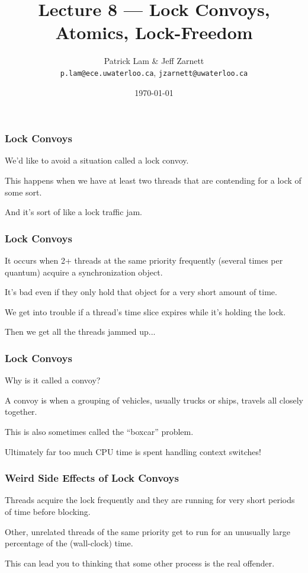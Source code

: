 

\title{Lecture 8 --- Lock Convoys, Atomics, Lock-Freedom}

\author{Patrick Lam \& Jeff Zarnett \\ \small \texttt{p.lam@ece.uwaterloo.ca}, \texttt{jzarnett@uwaterloo.ca}}
\date{\today}




\begin{frame}
  \titlepage

 \end{frame}
 

\begin{frame}
\frametitle{Lock Convoys}
We'd like to avoid a situation called a \alert{lock convoy}. 

This happens when we have at least two threads that are contending for a lock of some sort. 

And it's sort of like a lock traffic jam.

\end{frame}


\begin{frame}
\frametitle{Lock Convoys}

It occurs when 2+ threads at the same priority frequently (several times per quantum) acquire a synchronization object. 

It's bad even if they only hold that object for a very short amount of time. 

We get into trouble if a thread's time slice expires while it's holding the lock.

Then we get all the threads jammed up...

\end{frame}

\begin{frame}
\frametitle{Lock Convoys}
Why is it called a convoy? 

A convoy is when a grouping of vehicles, usually trucks or ships, travels all closely together.

This is also sometimes called the ``boxcar'' problem.

Ultimately far too much CPU time is spent handling context switches!

\end{frame}


\begin{frame}
\frametitle{Weird Side Effects of Lock Convoys}

Threads acquire the lock frequently and they are running for very short periods of time before blocking. 

Other, unrelated threads of the same priority get to run for an unusually large percentage of the (wall-clock) time. 

This can lead you to thinking that some other process is the real offender.

\end{frame}

